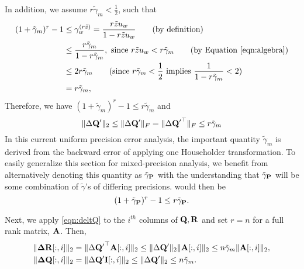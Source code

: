In addition, we assume $r\tilde{\gamma}_m< \frac{1}{2}$, such that 
\begin{align}
(1+\tilde{\gamma}_m)^r-1 &\leq \gamma_w^{(r\tilde{z})} = \frac{r\tilde{z}u_w}{1-r\tilde{z}u_w}\qquad\text{(by definition)}\\
&\leq \frac{r\tilde{\gamma}_m}{1-r\tilde{\gamma}_m},\text{ since } r\tilde{z}u_w < r\tilde{\gamma}_m\qquad\text{(by Equation \ref{eqn:algebra})}\\
&\leq 2 r \tilde{\gamma}_m\qquad\text{(since $r\tilde{\gamma}_m< \frac{1}{2}$ implies  $\frac{1}{1-r\tilde{\gamma}_m} < 2$)}\\
&= r\tilde{\gamma}_m, \label{eqn:algebra2}
\end{align}
Therefore, we have $(1+\tilde{\gamma}_m)^r-1 \leq r\tilde{\gamma}_m$ and
\begin{equation}
	 \|\Delta \bb{Q'}\|_2\leq \|\Delta \bb{Q'}\|_F = \|\Delta \bb{Q'}^{\top}\|_F\leq r \tilde{\gamma}_{m} \label{eqn:deltQ}
\end{equation}
In this current uniform precision error analysis, the important quantity $\tilde{\gamma}_{m}$ is derived from the backward error of applying one Householder transformation.
To easily generalize this section for mixed-precision analysis, we benefit from alternatively denoting this quantity as $\tilde{\gamma}_{\mathbf{P}}$ with the understanding that $\tilde{\gamma}_{\mathbf{P}}$ will be some combination of $\tilde{\gamma}$'s of differing precisions. 
 would then be 
\begin{equation}
	(1+\tilde{\gamma}_{\bb{P}})^r-1 \leq r\tilde{\gamma}_{\bb{P}}. \label{eqn:algebra3}
\end{equation}

Next, we apply \cref{eqn:deltQ} to the $i^{th}$ columns of $\mathbf{Q},\mathbf{R}$ and set $r=n$ for a full rank matrix, $\mathbf{A}$.
Then,
\begin{align*}
	\|\mathbf{\Delta R}[:,i]\|_2 &= \|\Delta \mathbf{Q'}^{\top}\mathbf{A}[:,i]\|_2 \leq \|\Delta \mathbf{Q'}\|_2 \|\mathbf{A}[:,i]\|_2  \leq n\tilde{\gamma}_{m} \|\mathbf{A}[:,i]\|_2, \\ 
	\|\mathbf{\Delta Q}[:,i]\|_2 &= \|\Delta \mathbf{Q'}\mathbf{I}[:,i]\|_2 \leq \|\Delta \mathbf{Q'}\|_2\leq n\tilde{\gamma}_{m}.
\end{align*}


